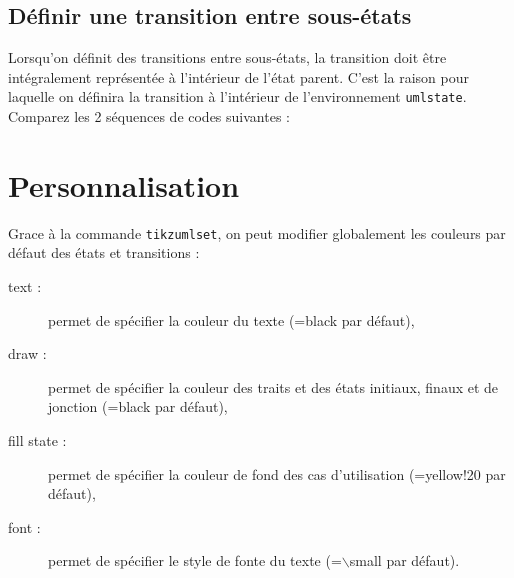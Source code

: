 \documentclass[a4paper,11pt]{report}
\newcommand{\inputTikZ}[1]{%
  }%
\newcommand{\inputTikZ}[1]{%
    \texttt{[image: fig/\#1.pdf]}%
  }%
\begin{document}
\subsection{Définir une transition entre sous-états}\label{ss.substatetrans}

Lorsqu'on définit des transitions entre sous-états, la transition doit être intégralement représentée à l'intérieur de l'état parent. C'est la raison pour laquelle on définira la transition à l'intérieur de l'environnement {\tt umlstate}. Comparez les 2 séquences de codes suivantes :

\medskip

\begin{minipage}{0.51\textwidth}

\end{minipage}
\begin{minipage}{0.49\textwidth}
\begin{center}
\inputTikZ{transitioninnerbug}
\end{center}
\end{minipage}

\begin{minipage}{0.51\textwidth}

\end{minipage}
\begin{minipage}{0.49\textwidth}
\begin{center}
\inputTikZ{transitioninner}
\end{center}
\end{minipage}

\section{Personnalisation}\label{s.fitstatetrans}

Grace à la commande {\tt tikzumlset}, on peut modifier globalement les couleurs par défaut des états et transitions :

\begin{description}
\item[text :] permet de spécifier la couleur du texte (=black par défaut),
\item[draw :] permet de spécifier la couleur des traits et des états initiaux, finaux et de jonction (=black par défaut),
\item[fill state :] permet de spécifier la couleur de fond des cas d'utilisation (=yellow!20 par défaut),
\item[font :] permet de spécifier le style de fonte du texte (=$\backslash$small par défaut).
\end{description}
\end{document}
